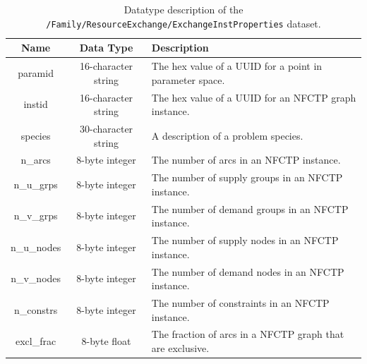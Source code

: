 \begin{table}[h!]
\centering
\caption{\label{tbl:/Family/ResourceExchange/ExchangeInstProperties}
Datatype description of the \lstinline[basicstyle=\ttfamily\color{black}]|/Family/ResourceExchange/ExchangeInstProperties| dataset.}
\begin{tabularx}{\columnwidth-10pt}{|c|c|X|} %
\hline
\textbf{Name} & \textbf{Data Type} & \textbf{Description}       \\ \hline
paramid & 16-character string & The hex value of a UUID for a point in parameter space. \\ \hline
instid & 16-character string & The hex value of a UUID for an NFCTP graph instance. \\ \hline
species & 30-character string & A description of a problem species. \\ \hline
n\_arcs & 8-byte integer & The number of arcs in an NFCTP instance. \\ \hline
n\_u\_grps & 8-byte integer & The number of supply groups in an NFCTP instance. \\ \hline
n\_v\_grps & 8-byte integer & The number of demand groups in an NFCTP instance. \\ \hline
n\_u\_nodes & 8-byte integer & The number of supply nodes in an NFCTP instance. \\ \hline
n\_v\_nodes & 8-byte integer & The number of demand nodes in an NFCTP instance. \\ \hline
n\_constrs & 8-byte integer & The number of constraints in an NFCTP instance. \\ \hline
excl\_frac & 8-byte float & The fraction of arcs in a NFCTP graph that are exclusive. \\ \hline
\end{tabularx}
\end{table}

